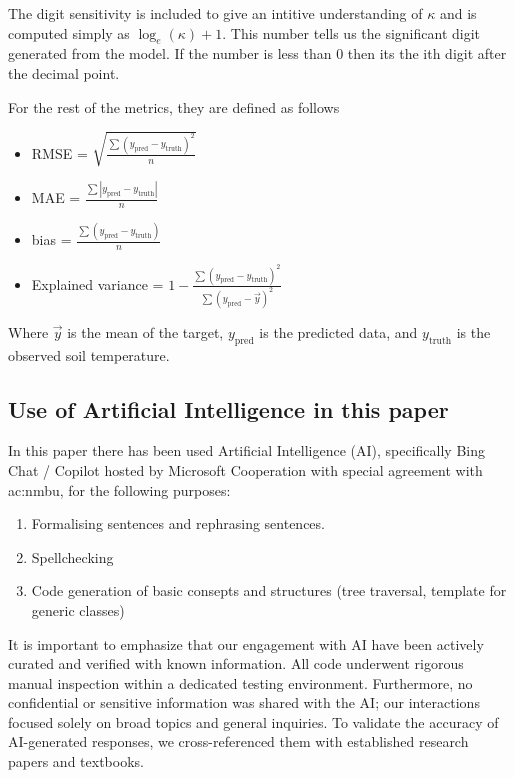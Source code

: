 The digit sensitivity is included to give an intitive understanding of $\kappa$ and is computed simply as $\log_e(\kappa)+1$. This number tells us the significant digit generated from the model. If the number is less than 0 then its the ith digit after the decimal point.

For the rest of the metrics, they are defined as follows
\begin{itemize}
	\item RMSE = $\sqrt{\frac{\sum (y_{\text{pred}} - y_{\text{truth}})^2}{n}}$
	\item MAE = $\frac{\sum \left| y_{\text{pred}} - y_{\text{truth}}\right|}{n}$
	\item bias = $\frac{\sum ( y_{\text{pred}} - y_{\text{truth}})}{n}$
	\item Explained variance = $1-\frac{\sum (y_{\text{pred}} - y_{\text{truth}})^2}{\sum (y_{\text{pred}} - \vec{y})^2}$
\end{itemize}

Where $\vec{y}$ is the mean of the target, $y_{\text{pred}}$ is the predicted data, and $y_{\text{truth}}$ is the observed soil temperature.

\subsection[Use of AI]{Use of Artificial Intelligence in this paper}

In this paper there has been used Artificial Intelligence (AI), specifically Bing Chat / Copilot hosted by Microsoft Cooperation with special agreement with \acrfull{ac:nmbu}, for the following purposes:

\begin{enumerate}
	\item Formalising sentences and rephrasing sentences.
	\item Spellchecking
	\item Code generation of basic consepts and structures (tree traversal, template for generic classes) 
\end{enumerate}

It is important to emphasize that our engagement with AI have been actively curated and verified with known information. All code underwent rigorous manual inspection within a dedicated testing environment. Furthermore, no confidential or sensitive information was shared with the AI; our interactions focused solely on broad topics and general inquiries. To validate the accuracy of AI-generated responses, we cross-referenced them with established research papers and textbooks.